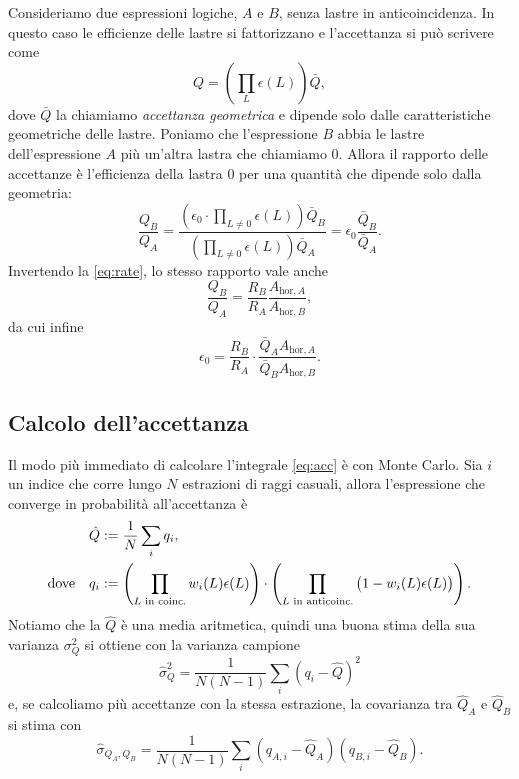 Consideriamo due espressioni logiche, $A$ e $B$, senza lastre in anticoincidenza.
In questo caso le efficienze delle lastre si fattorizzano e l'accettanza si può scrivere come
\begin{equation*}
	Q = \left( \prod_L \epsilon(L) \right) \bar Q,
\end{equation*}
dove $\bar Q$ la chiamiamo \emph{accettanza geometrica}
e dipende solo dalle caratteristiche geometriche delle lastre.
Poniamo che l'espressione $B$ abbia le lastre dell'espressione $A$ più un'altra lastra che chiamiamo $0$.
Allora il rapporto delle accettanze è l'efficienza della lastra $0$ per una quantità che dipende solo dalla geometria:
\begin{equation*}
	\frac{Q_B}{Q_A} = \frac
	{\left( \epsilon_0 \cdot \prod_{L\neq 0} \epsilon(L) \right) \bar Q_B}
	{\left( \prod_{L\neq 0} \epsilon(L) \right) \bar Q_A}
	= \epsilon_0 \frac{\bar Q_B}{\bar Q_A}.
\end{equation*}
Invertendo la \eqref{eq:rate}, lo stesso rapporto vale anche
\begin{equation*}
	\frac{Q_B}{Q_A} = \frac{R_B}{R_A} \frac{A_{\text{hor},A}}{A_{\text{hor},B}},
\end{equation*}
da cui infine
\begin{equation*}
	\epsilon_0 = \frac{R_B}{R_A} \cdot \frac{\bar Q_A A_{\text{hor},A}}{\bar Q_B A_{\text{hor},B}}.
\end{equation*}

\subsection{Calcolo dell'accettanza}

Il modo più immediato di calcolare l'integrale \eqref{eq:acc} è con Monte Carlo.
Sia $i$ un indice che corre lungo $N$ estrazioni di raggi casuali,
allora l'espressione che converge in probabilità all'accettanza è
\begin{align}
	\label{eq:accmc}
	\hat Q &:= \frac1N \sum_i q_i, \\
	\text{dove}\quad q_i &:=
	\left( \prod_\text{$L$ in coinc.} w_i(L) \epsilon(L) \right)
	\cdot \left( \prod_\text{$L$ in anticoinc.} \big(1 - w_i(L) \epsilon(L)\big) \right). \notag
\end{align}
Notiamo che la $\hat Q$ è una media aritmetica,
quindi una buona stima della sua varianza $\sigma_Q^2$ si ottiene con la varianza campione
\begin{equation*}
	\hat\sigma_Q^2
	= \frac1{N(N-1)} \sum_i (q_i - \hat Q)^2
\end{equation*}
e, se calcoliamo più accettanze con la stessa estrazione,
la covarianza tra $\hat Q_A$ e $\hat Q_B$ si stima con
\begin{equation*}
	\hat\sigma_{Q_A,Q_B}
	= \frac1{N(N-1)} \sum_i (q_{A,i} - \hat Q_A) (q_{B,i} - \hat Q_B).
\end{equation*}
